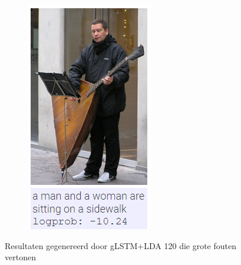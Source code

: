 \begin{figure}
\begin{subfigure}{.5\textwidth}
			\includegraphics[width=.8\linewidth]{Images/Results/Bad/sitting_sidewalk}
			\label{fig:badresults6}
		\end{subfigure}
		
		\caption{Resultaten gegenereerd door gLSTM+LDA 120 die grote fouten vertonen}
		\label{fig:badresults}
	\end{figure}

